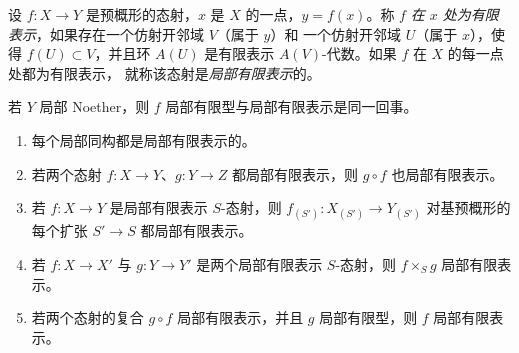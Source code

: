 \begin{definition}[1.4.2]
\label{IV.1.4.2-fr}
设 $f:X\to Y$ 是预概形的态射，$x$ 是 $X$ 的一点，$y=f(x)$。称 $f$
\emph{在 $x$ 处为有限表示}，如果存在一个仿射开邻域 $V$（属于 $y$）和
一个仿射开邻域 $U$（属于 $x$），使得 $f(U)\subset V$，并且环
$A(U)$ 是有限表示 $A(V)$-代数。如果 $f$ 在 $X$ 的每一点处都为有限表示，
就称该态射是\emph{局部有限表示}的。
\end{definition}

若 $Y$ 局部 Noether，则 $f$ 局部有限型与局部有限表示是同一回事。

\begin{proposition}[1.4.3]
\label{IV.1.4.3-fr}
\begin{enumerate}
  \item[(i)] 每个局部同构都是局部有限表示的。
  \item[(ii)] 若两个态射 $f:X\to Y$、$g:Y\to Z$ 都局部有限表示，则
  $g\circ f$ 也局部有限表示。


  \item[(iii)] 若 $f:X\to Y$ 是局部有限表示 $S$-态射，则
  $f_{(S')}:X_{(S')}\to Y_{(S')}$ 对基预概形的每个扩张 $S'\to S$
  都局部有限表示。
  \item[(iv)] 若 $f:X\to X'$ 与 $g:Y\to Y'$ 是两个局部有限表示
  $S$-态射，则 $f\times_Sg$ 局部有限表示。
  \item[(v)] 若两个态射的复合 $g\circ f$ 局部有限表示，并且 $g$
  局部有限型，则 $f$ 局部有限表示。
\end{enumerate}
\end{proposition}


